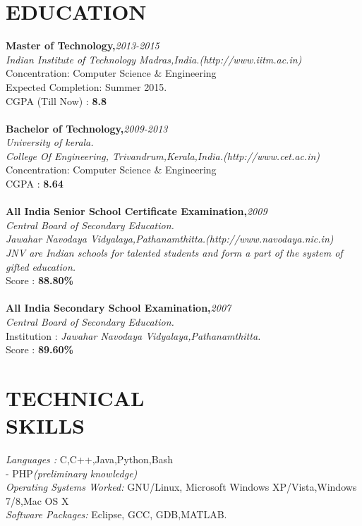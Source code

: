 \documentclass[line,margin]{res}
\begin{document}
\begin{resume}
  \section{EDUCATION} 
          {\bf Master of Technology,}\hfill {\it 2013-2015}\\
          {\it Indian Institute of Technology Madras,India.\hfill(http://www.iitm.ac.in)} \\
          Concentration: Computer Science \& Engineering \\
          Expected Completion: Summer 2015.\\ 
          CGPA (Till Now) : {\bf 8.8} \\\\
          {\bf Bachelor of Technology,}\hfill {\it 2009-2013}\\
          {\it University of kerala.}\\ 
          {\it College Of Engineering, Trivandrum,Kerala,India.\hfill(http://www.cet.ac.in)} \\
          Concentration: Computer Science \& Engineering \\
          CGPA : {\bf 8.64} \\\\
          {\bf All India Senior School Certificate Examination,}\hfill {\it 2009}\\        
          {\it Central Board of Secondary Education.}\\
          {\it Jawahar Navodaya Vidyalaya,Pathanamthitta.}\hfill{\it(http://www.navodaya.nic.in)}\\
          {\it JNV are Indian schools for talented students and form a part of the system of gifted education.}\\
          Score       : {\bf 88.80\% } \\\\
          {\bf All India Secondary School Examination,}\hfill {\it 2007}\\
          {\it Central Board of Secondary Education.}\\
          Institution : {\it Jawahar Navodaya Vidyalaya,Pathanamthitta.} \\ 
          Score       : {\bf 89.60\% } \\
	  \section{TECHNICAL \\ SKILLS} 
		  {\it Languages :} C,C++,Java,Python,Bash\\-\hspace{15 mm} PHP{\it (preliminary knowledge)}\\
		  {\it Operating Systems Worked:} GNU/Linux, Microsoft Windows XP/Vista,Windows 7/8,Mac OS X\\
		  {\it Software Packages:} Eclipse, GCC, GDB,MATLAB.\\

\end{resume}
\end{document}
